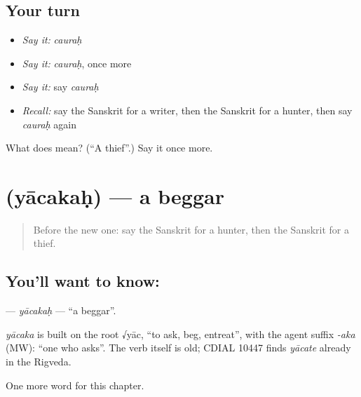 \subsection*{Your turn}
\begin{itemize}
\raggedright
  \item \emph{Say it:} \emph{cauraḥ}
  \item \emph{Say it:} \emph{cauraḥ}, once more
  \item \emph{Say it:} say \emph{cauraḥ}
  \item \emph{Recall:} say the Sanskrit for a writer, then the Sanskrit for a hunter, then say \emph{cauraḥ} again
\end{itemize}

\begin{tcolorbox}[breakable,colback=teal!4,colframe=teal!35!black,title={Before you move on}]
What does  mean? (\textquotedblleft{}A thief\textquotedblright{}.) Say it once more.
\end{tcolorbox}
\section[\texorpdfstring{\sk{याचकः} (yācakaḥ)}{याचकः (yācakaḥ)}]{ (yācakaḥ) — a beggar}

\label{lesson:SA-C180-yacakah}



\begin{quote}
Before the new one: say the Sanskrit for a hunter, then the Sanskrit for a thief.
\end{quote}

\subsection*{You'll want to know: }
\textbf{} — \emph{yācakaḥ} — \textquotedblleft{}a beggar\textquotedblright{}.

\begin{cousinweb}
\emph{yācaka} is built on the root √yāc, \textquotedblleft{}to ask, beg, entreat\textquotedblright{}, with the agent suffix \emph{-aka} (MW): \textquotedblleft{}one who asks\textquotedblright{}. The verb itself is old; CDIAL 10447 finds \emph{yācate} already in the Rigveda.
\end{cousinweb}

\begin{grammarlens}[title={What you've built}]
One more word for this chapter.
\end{grammarlens}

